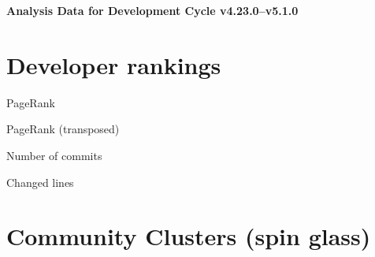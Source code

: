\documentclass{article}
\begin{document}
\setlength{\parindent}{0pt}
\begin{center}
\begin{Large}
\textbf{Analysis Data for Development Cycle v4.23.0--v5.1.0}
\end{Large}
\end{center}
\section{Developer rankings}
\begin{small}\renewcommand{\tabcolsep}{1pt}
\begin{minipage}{0.5\linewidth}
PageRank\\

\end{minipage}%
\begin{minipage}{0.5\linewidth}
PageRank (transposed)\\

\end{minipage}

\renewcommand{\tabcolsep}{5pt}
\begin{minipage}{0.5\linewidth}
Number of commits\\

\end{minipage}%
\begin{minipage}{0.5\linewidth}
Changed lines\\

\end{minipage}
\end{small}
\newpage\section{Community Clusters (spin glass)}
\end{document}
